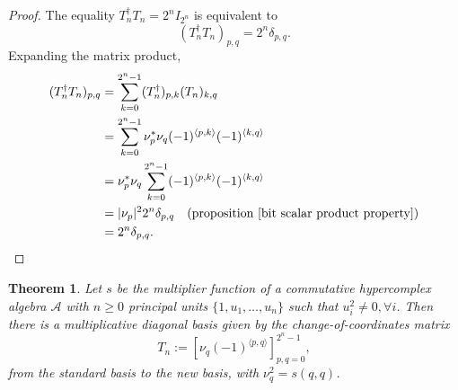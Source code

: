\documentclass{article}
\newtheorem{theorem}{Theorem}
\begin{document}
\begin{proof}
    The equality $T_n^{\dagger} T_n = 2^n I_{2^n}$ is equivalent to
    $$ (T_n^{\dagger} T_n)_{p,q} = 2^n \delta_{p,q}. $$
    Expanding the matrix product,
    $$ \begin{aligned}
        (T_n^{\dagger} T_n)_{p,q} &= \sum_{k=0}^{2^n-1} (T_n^{\dagger})_{p,k} (T_n)_{k,q}\\
        &= \sum_{k=0}^{2^n-1} \nu_p^* \nu_q (-1)^{\langle p,k\rangle} (-1)^{\langle k,q\rangle}\\
        &= \nu_p^* \nu_q \sum_{k=0}^{2^n-1} (-1)^{\langle p,k\rangle} (-1)^{\langle k,q\rangle}\\
        &= |\nu_p|^2 2^n \delta_{p,q} \quad \text{(proposition \ref{bit scalar product property})}\\
        &= 2^n \delta_{p,q}.
    \end{aligned} $$
\end{proof}
\begin{theorem}
    \label{theorem : algorithm-like diagonal basis}
    Let $s$ be the multiplier function of a commutative hypercomplex algebra $\mathcal{A}$ with $n \geq 0$ principal units $\{1,u_1, \ldots,u_n\}$ such that $u_i^2 \neq 0, \forall i$. Then there is a multiplicative diagonal basis given by the change-of-coordinates matrix
    $$ T_n := [\nu_q (-1)^{\langle p,q\rangle}]_{p,q=0}^{2^n-1}, $$
    from the standard basis to the new basis, with $\nu_q^2 = s(q,q)$.
\end{theorem}
\end{document}

